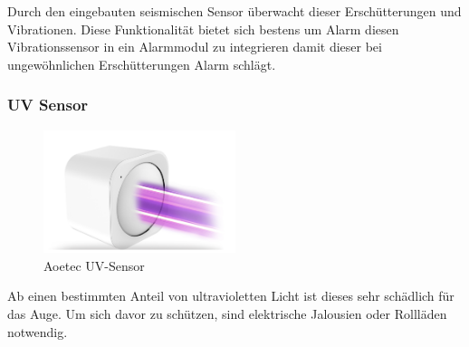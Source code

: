 Durch den eingebauten seismischen Sensor überwacht dieser Erschütterungen und Vibrationen. Diese Funktionalität bietet sich bestens um Alarm diesen Vibrationssensor in ein Alarmmodul zu integrieren damit dieser bei ungewöhnlichen Erschütterungen Alarm schlägt.

\subsubsection{UV Sensor}
\begin{figure}[h!]
	\centering
	\includegraphics[width=0.5\textwidth]{img/Sensorevaluation/AeoUV.png}
	\caption{Aoetec UV-Sensor}
	\label{fig:sensorenAeoUV}
\end{figure}

Ab einen bestimmten Anteil von ultravioletten Licht ist dieses sehr schädlich für das Auge. Um sich davor zu schützen, sind elektrische Jalousien oder Rollläden notwendig.




